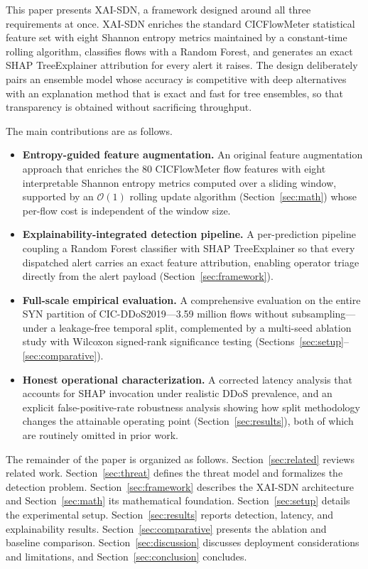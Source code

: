 ﻿\documentclass[journal]{IEEEtran}
\begin{document}
This paper presents XAI-SDN, a framework designed around all three requirements at once. XAI-SDN enriches the standard CICFlowMeter statistical feature set with eight Shannon entropy metrics maintained by a constant-time rolling algorithm, classifies flows with a Random Forest, and generates an exact SHAP TreeExplainer attribution for every alert it raises. The design deliberately pairs an ensemble model whose accuracy is competitive with deep alternatives with an explanation method that is exact and fast for tree ensembles, so that transparency is obtained without sacrificing throughput.

The main contributions are as follows.
\begin{itemize}
\item \textbf{Entropy-guided feature augmentation.} An original feature augmentation approach that enriches the 80 CICFlowMeter flow features with eight interpretable Shannon entropy metrics computed over a sliding window, supported by an $\mathcal{O}(1)$ rolling update algorithm (Section~\ref{sec:math}) whose per-flow cost is independent of the window size.
\item \textbf{Explainability-integrated detection pipeline.} A per-prediction pipeline coupling a Random Forest classifier with SHAP TreeExplainer so that every dispatched alert carries an exact feature attribution, enabling operator triage directly from the alert payload (Section~\ref{sec:framework}).
\item \textbf{Full-scale empirical evaluation.} A comprehensive evaluation on the entire SYN partition of CIC-DDoS2019---3.59 million flows without subsampling---under a leakage-free temporal split, complemented by a multi-seed ablation study with Wilcoxon signed-rank significance testing (Sections~\ref{sec:setup}--\ref{sec:comparative}).
\item \textbf{Honest operational characterization.} A corrected latency analysis that accounts for SHAP invocation under realistic DDoS prevalence, and an explicit false-positive-rate robustness analysis showing how split methodology changes the attainable operating point (Section~\ref{sec:results}), both of which are routinely omitted in prior work.
\end{itemize}

The remainder of the paper is organized as follows. Section~\ref{sec:related} reviews related work. Section~\ref{sec:threat} defines the threat model and formalizes the detection problem. Section~\ref{sec:framework} describes the XAI-SDN architecture and Section~\ref{sec:math} its mathematical foundation. Section~\ref{sec:setup} details the experimental setup. Section~\ref{sec:results} reports detection, latency, and explainability results. Section~\ref{sec:comparative} presents the ablation and baseline comparison. Section~\ref{sec:discussion} discusses deployment considerations and limitations, and Section~\ref{sec:conclusion} concludes.
\end{document}
